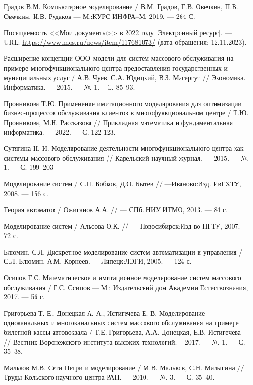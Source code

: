 
\renewcommand\bibname{СПИСОК ИСПОЛЬЗОВАННЫХ ИСТОЧНИКОВ}
\begin{thebibliography}{}
	
\setlength\bibindent{1.25cm}
\makeatletter
\let\old@biblabel\@biblabel
\def\@biblabel#1{\kern\bibindent\old@biblabel{#1}}
\makeatother

 Градов В.М. Компьютерное моделирование / В.М. Градов, Г.В. Овечкин, П.В. Овечкин, И.В. Рудаков --- М.:КУРС ИНФРА--М, 2019. --- 264 С. 

 Посещаемость <<Мои документы>> в 2022 году [Электронный ресурс]. --- URL: \url{https://www.mos.ru/news/item/117681073/} (дата обращения: 12.11.2023).

  Расширение концепции ООО--модели для систем массового обслуживания на примере многофункционального центра предоставления государственных и муниципальных услуг / А.В. Чуев, С.А. Юдицкий, В.З. Магергут // Экономика. Информатика. --- 2015. --- №. 1. – С. 85--93.

 Пронникова Т.Ю. Применение имитационного моделирования для оптимизации бизнес-процессов обслуживания клиентов в многофункциональном центре / Т.Ю. Пронникова, М.Н. Рассказова // Прикладная математика и фундаментальная информатика. --- 2022. --- С. 122-123.

 Сутягина Н. И. Моделирование деятельности многофункционального центра как системы массового обслуживания // Карельский научный журнал. --- 2015. --- №. 1. --- С. 199--203.

 Моделирование систем / С.П. Бобков, Д.О. Бытев // ---Иваново:Изд. ИвГХТУ, 2008. --- 156 с. 

 Теория автоматов / Ожиганов А.А. // --- СПб.:НИУ ИТМО, 2013. --- 84 с. 

 Моделирование систем / Альсова О.К. // --- Новосибирск:Изд-во НГТУ, 2007. --- 72 с.

 Блюмин, С.Л. Дискретное моделирование систем автоматизации и управления / С.Л. Блюмин, А.М. Корнеев. --- Липецк:ЛЭГИ, 2005. --- 124 с.

 Осипов Г.С. Математическое и имитационное моделирование систем массового
обслуживания / Г.С. Осипов --- М.: Издательский дом Академии Естествознания, 2017. --- 56 с.

 Григорьева Т. Е., Донецкая А. А., Истигечева Е. В. Моделирование одноканальных и многоканальных систем массового обслуживания на примере билетной кассы автовокзала / Т.Е. Григорьева, А.А. Донецкая, Е.В. Истигечева  // Вестник Воронежского института высоких технологий. -- 2017. --- №. 1. --- С. 35--38.

 Мальков М.В. Сети Петри и моделирование / М.В. Мальков, С.Н. Малыгина // Труды Кольского научного центра РАН. --- 2010. --- №. 3. --- С. 35--40.

\end{thebibliography}
